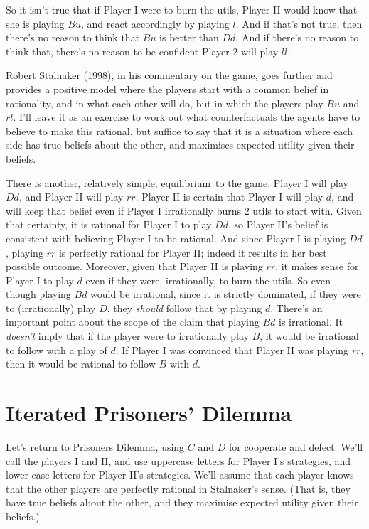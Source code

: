 \documentclass[
  11pt,
  letterpaper,
]{scrbook}
\begin{document}
So it isn't true that if Player I were to burn the utils, Player II
would know that she is playing \(Bu\), and react accordingly by playing
\(l\). And if that's not true, then there's no reason to think that
\(Bu\) is better than \(Dd\). And if there's no reason to think that,
there's no reason to be confident Player 2 will play \(ll\).

Robert Stalnaker (1998), in his commentary on the game, goes further and
provides a positive model where the players start with a common belief
in rationality, and in what each other will do, but in which the players
play \(Bu\) and \(rl\). I'll leave it as an exercise to work out what
counterfactuals the agents have to believe to make this rational, but
suffice to say that it is a situation where each side has true beliefs
about the other, and maximises expected utility given their beliefs.

There is another, relatively simple, equilibrium~to the game. Player I
will play \(Dd\), and Player II will play \(rr\). Player II is certain
that Player I will play \(d\), and will keep that belief even if Player
I irrationally burns 2 utils to start with. Given that certainty, it is
rational for Player I to play \(Dd\), so Player II's belief is
consistent with believing Player I to be rational. And since Player I is
playing \(Dd\), playing \(rr\) is perfectly rational for Player II;
indeed it results in her best possible outcome. Moreover, given that
Player II is playing \(rr\), it makes sense for Player I to play \(d\)
even if they were, irrationally, to burn the utils. So even though
playing \(Bd\) would be irrational, since it is strictly dominated, if
they were to (irrationally) play \(D\), they \emph{should} follow that
by playing \(d\). There's an important point about the scope of the
claim that playing \(Bd\) is irrational. It \emph{doesn't} imply that if
the player were to irrationally play \(B\), it would be irrational to
follow with a play of \(d\). If Player I was convinced that Player II
was playing \(rr\), then it would be rational to follow \(B\) with
\(d\).

\section{Iterated Prisoners' Dilemma}\label{sec-iterated-pd}

Let's return to Prisoners Dilemma, using \(C\) and \(D\) for cooperate
and defect. We'll call the players I and II, and use uppercase letters
for Player I's strategies, and lower case letters for Player II's
strategies. We'll assume that each player knows that the other players
are perfectly rational in Stalnaker's sense. (That is, they have true
beliefs about the other, and they maximise expected utility given their
beliefs.)
\end{document}
